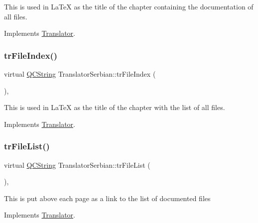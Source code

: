This is used in La\+TeX as the title of the chapter containing the documentation of all files. 

Implements \mbox{\hyperlink{class_translator}{Translator}}.

\mbox{\label{class_translator_serbian_a4d3964712614072f853e0971baf9ee1e}} 
\subsubsection{\texorpdfstring{trFileIndex()}{trFileIndex()}}
{\footnotesize\ttfamily virtual \mbox{\hyperlink{class_q_c_string}{Q\+C\+String}} Translator\+Serbian\+::tr\+File\+Index (\begin{DoxyParamCaption}{ }\end{DoxyParamCaption})\hspace{0.3cm}{\ttfamily [inline]}, {\ttfamily [virtual]}}

This is used in La\+TeX as the title of the chapter with the list of all files. 

Implements \mbox{\hyperlink{class_translator}{Translator}}.

\mbox{\label{class_translator_serbian_a33852e44dc387e4d99534a6ed88708a8}} 
\subsubsection{\texorpdfstring{trFileList()}{trFileList()}}
{\footnotesize\ttfamily virtual \mbox{\hyperlink{class_q_c_string}{Q\+C\+String}} Translator\+Serbian\+::tr\+File\+List (\begin{DoxyParamCaption}{ }\end{DoxyParamCaption})\hspace{0.3cm}{\ttfamily [inline]}, {\ttfamily [virtual]}}

This is put above each page as a link to the list of documented files 

Implements \mbox{\hyperlink{class_translator}{Translator}}.

\mbox{\label{class_translator_serbian_a48d37cbfe1d7b864abb2cffb766f505d}} 
